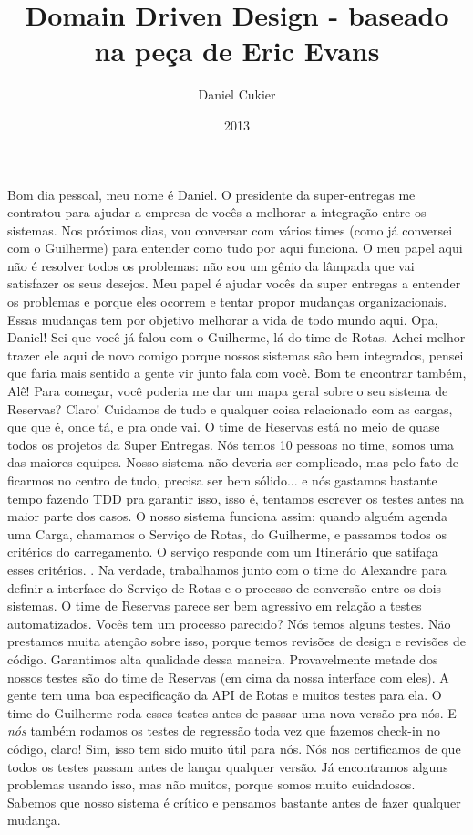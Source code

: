 \documentclass[12pt,play]{article}
\title{Domain Driven Design - baseado na peça de Eric Evans}
\author{Daniel Cukier}
\date{2013}
\begin{document}
\playstart


\act
\scene
{}
\dani Bom dia pessoal, meu nome é Daniel. O presidente da super-entregas me contratou para ajudar a empresa de vocês a melhorar a integração entre os sistemas. Nos próximos dias, vou conversar com vários times (como já conversei com o Guilherme) para entender como tudo por aqui funciona. O meu papel aqui não é resolver todos os problemas: não sou um gênio da lâmpada que vai satisfazer os seus desejos. Meu papel é ajudar vocês da super entregas a entender os problemas e porque eles ocorrem e tentar propor mudanças organizacionais. Essas mudanças tem por objetivo melhorar a vida de todo mundo aqui.
\alex Opa, Daniel! Sei que você já falou com o Guilherme, lá do time de Rotas. Achei melhor trazer ele aqui de novo comigo porque nossos sistemas são bem integrados, pensei que faria mais sentido a gente vir junto fala com você.
\dani Bom te encontrar também, Alê! Para começar, você poderia me dar um mapa geral sobre o seu sistema de Reservas?
\alex Claro! Cuidamos de tudo e qualquer coisa relacionado com as cargas, que que é, onde tá, e pra onde vai. O time de Reservas está no meio de quase todos os projetos da Super Entregas. Nós temos 10 pessoas no time, somos uma das maiores equipes. Nosso sistema não deveria ser complicado, mas pelo fato de ficarmos no centro de tudo, precisa ser bem sólido... e nós gastamos bastante tempo fazendo TDD pra garantir isso, isso é, tentamos escrever os testes antes na maior parte dos casos.
O nosso sistema funciona assim: quando alguém agenda uma Carga, chamamos o Serviço de Rotas, do Guilherme, e passamos todos os critérios do carregamento. O serviço responde com um Itinerário que satifaça esses critérios.
.
\gui Na verdade, trabalhamos junto com o time do Alexandre para definir a interface do Serviço de Rotas e o processo de conversão entre os dois sistemas.
\dani O time de Reservas parece ser bem agressivo em relação a testes automatizados. Vocês tem um processo parecido?
\gui Nós temos alguns testes.  Não prestamos muita atenção sobre isso, porque temos revisões de design e revisões de código. Garantimos alta qualidade dessa maneira. Provavelmente metade dos nossos testes são do time de Reservas (em cima da nossa interface com eles).
\alex A gente tem uma boa especificação da API de Rotas e muitos testes para ela. O time do Guilherme roda esses testes antes de passar uma nova versão pra nós. E \emph{nós} também rodamos os testes de regressão toda vez que fazemos check-in no código, claro!
\gui Sim, isso tem sido muito útil para nós. Nós nos certificamos de que todos os testes passam antes de lançar qualquer versão. Já encontramos alguns problemas usando isso, mas não muitos, porque somos muito cuidadosos. Sabemos que nosso sistema é crítico e pensamos bastante antes de fazer qualquer mudança.
\end{document}
